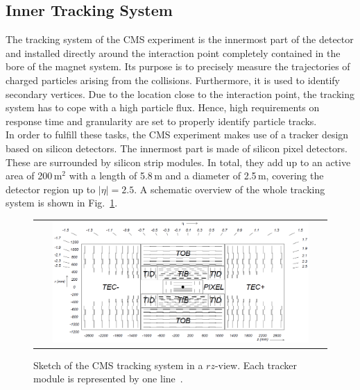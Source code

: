 \subsection{Inner Tracking System}
\label{subsec:cms_tracker}
The tracking system of the CMS experiment is the innermost part of the detector and installed directly around the interaction point completely contained in the bore of the magnet system. Its purpose is to precisely measure the trajectories of charged particles arising from the collisions. Furthermore, it is used to identify secondary vertices. Due to the location close to the interaction point, the tracking system has to cope with a high particle flux. Hence, high requirements on response time and granularity are set to properly identify particle tracks. \\
In order to fulfill these tasks, the CMS experiment makes use of a tracker design based on silicon detectors. The innermost part is made of silicon pixel detectors. These are surrounded by silicon strip modules. In total, they add up to an active area of 200\,$\mathrm{m}^2$ with a length of 5.8\,m and a diameter of 2.5\,m, covering the detector region up to $|\eta| = 2.5$. A schematic overview of the whole tracking system is shown in Fig.~\ref{fig:CMS_tracker}. 
\begin{figure}[!tp]
  \centering
  \begin{tabular}{c}
    \includegraphics[width=0.9\textwidth]{figures/Figures_Experimental_Apparatus_Tracker.png}
  \end{tabular}
  \caption{Sketch of the CMS tracking system in a $rz$-view. Each tracker module is represented by one line~\cite{Chatrchyan:2008zzk}.}
  \label{fig:CMS_tracker}
\end{figure} 
